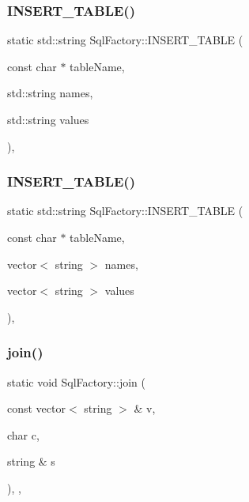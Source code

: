 \subsubsection{\texorpdfstring{I\+N\+S\+E\+R\+T\+\_\+\+T\+A\+B\+L\+E()}{INSERT\_TABLE()}\hspace{0.1cm}{\footnotesize\ttfamily [1/2]}}
{\footnotesize\ttfamily static std\+::string Sql\+Factory\+::\+I\+N\+S\+E\+R\+T\+\_\+\+T\+A\+B\+LE (\begin{DoxyParamCaption}\item[{const char $\ast$}]{table\+Name,  }\item[{std\+::string}]{names,  }\item[{std\+::string}]{values }\end{DoxyParamCaption})\hspace{0.3cm}{\ttfamily [inline]}, {\ttfamily [static]}}

\mbox{\label{classSqlFactory_aa3bf3f1cf57e9980d740809a249db516}} 
\subsubsection{\texorpdfstring{I\+N\+S\+E\+R\+T\+\_\+\+T\+A\+B\+L\+E()}{INSERT\_TABLE()}\hspace{0.1cm}{\footnotesize\ttfamily [2/2]}}
{\footnotesize\ttfamily static std\+::string Sql\+Factory\+::\+I\+N\+S\+E\+R\+T\+\_\+\+T\+A\+B\+LE (\begin{DoxyParamCaption}\item[{const char $\ast$}]{table\+Name,  }\item[{vector$<$ string $>$}]{names,  }\item[{vector$<$ string $>$}]{values }\end{DoxyParamCaption})\hspace{0.3cm}{\ttfamily [inline]}, {\ttfamily [static]}}

\mbox{\label{classSqlFactory_a1ce0da51370f2723f3ca34f40c3ae9ea}} 
\subsubsection{\texorpdfstring{join()}{join()}}
{\footnotesize\ttfamily static void Sql\+Factory\+::join (\begin{DoxyParamCaption}\item[{const vector$<$ string $>$ \&}]{v,  }\item[{char}]{c,  }\item[{string \&}]{s }\end{DoxyParamCaption})\hspace{0.3cm}{\ttfamily [inline]}, {\ttfamily [static]}, {\ttfamily [private]}}


